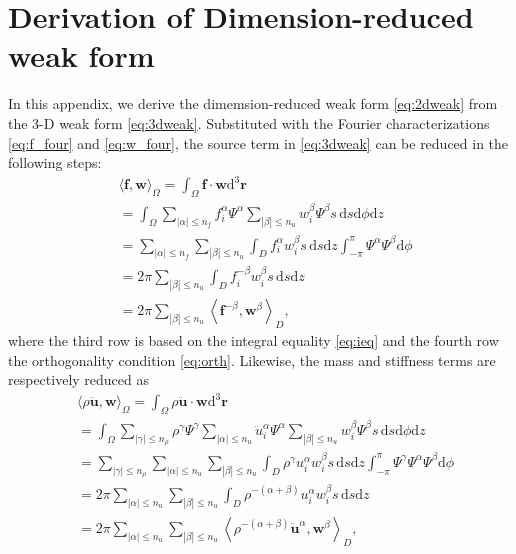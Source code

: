 \documentclass[extra]{gji}
\begin{document}
\section{Derivation of Dimension-reduced weak form}
\label{sec:dweak}
In this appendix, we derive the dimemsion-reduced weak form 
\eqref{eq:2dweak} from the 3-D weak form \eqref{eq:3dweak}.
Substituted with the Fourier characterizations \eqref{eq:f_four} and 
\eqref{eq:w_four}, the source term in \eqref{eq:3dweak} can be reduced 
in the following steps:
\begin{equation}
  \begin{alignedat}{1}
    &\langle \mathbf{f},\mathbf{w}\rangle _{\Omega} =
    \int_{\Omega}\mathbf{f}\cdot\mathbf{w}\text{d}^{3}\mathbf{r} \\&=
    \int_{\Omega} \sum_{|\alpha|\le n_f} f_i^\alpha \Psi^\alpha
    \sum_{|\beta|\le n_u}  w_i^\beta \Psi^\beta s\,\text{d}s\text{d}\phi \text{d}z \\&=
    \sum_{|\alpha|\le n_f} \sum_{|\beta|\le n_u}  
    \int_{D} f_i^\alpha w_i^\beta s\,\text{d}s\text{d}z 
    \int_{-\pi}^{\pi} \Psi^\alpha \Psi^\beta \text{d}\phi\\&=
    2\pi \sum_{|\beta|\le n_u} \int_{D} f_i^{-\beta} w_i^\beta s\,\text{d}s\text{d}z \\&=
    2\pi \sum_{|\beta|\le n_u} \left\langle \mathbf{f}^{-\beta},
    \mathbf{w}^{\beta}\right\rangle_{D},
  \end{alignedat}
  \label{eq:a1}
\end{equation}
where the third row is based on the integral equality \eqref{eq:ieq}
and the fourth row the orthogonality condition \eqref{eq:orth}.
Likewise, the mass and stiffness terms are respectively reduced as
\begin{equation}
  \begin{alignedat}{1}
    &\langle \rho \ddot{\mathbf{u}},\mathbf{w}\rangle _{\Omega} =
    \int_{\Omega} \rho \ddot{\mathbf{u}} \cdot\mathbf{w}\text{d}^{3}\mathbf{r} \\&=
    \int_{\Omega} \sum_{|\gamma|\le n_\rho} \rho^\gamma \Psi^\gamma
    \sum_{|\alpha|\le n_u} \ddot{u}_i^\alpha \Psi^\alpha
    \sum_{|\beta|\le n_u}  w_i^\beta \Psi^\beta s\,\text{d}s\text{d}\phi \text{d}z \\&=
    \sum_{|\gamma|\le n_\rho} \sum_{|\alpha|\le n_u} \sum_{|\beta|\le n_u}  
    \int_{D} \rho^\gamma u_i^\alpha w_i^\beta s\,\text{d}s\text{d}z 
    \int_{-\pi}^{\pi} \Psi^\gamma \Psi^\alpha \Psi^\beta \text{d}\phi\\&=
    2\pi \sum_{|\alpha|\le n_u} \sum_{|\beta|\le n_u} 
    \int_{D} \rho^{-\left(\alpha+\beta\right)} u_i^{\alpha} w_i^\beta s\,\text{d}s\text{d}z \\&=
    2\pi \sum_{|\alpha|\le n_u} \sum_{|\beta|\le n_u} 
    \left\langle \rho^{-\left(\alpha+\beta\right)} \ddot{\mathbf{u}}^{\alpha},
    \mathbf{w}^{\beta}\right\rangle_{D},
  \end{alignedat}
  \label{eq:a2}
\end{equation}
\end{document}
